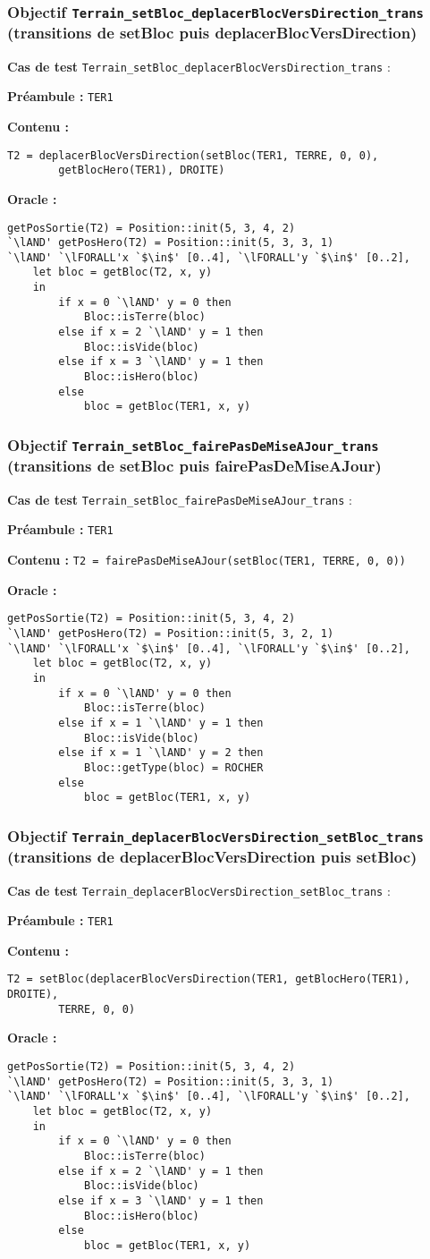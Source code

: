 \documentclass{article}
\newcommand{\cmd}[1]{\texttt{#1}}
\newcommand{\lAND}{$\land$}
\newcommand{\lFORALL}{$\forall$}
\newcommand{\obj}[2]{\subsubsection*{\large{\textbf{Objectif {\cmd{#1} (#2)}}}}}
\newenvironment{cas}[1]
{
	\hspace{1em}\textbf{Cas de test} \cmd{#1} :
	\begin{list}{}{}
}{
	\end{list}\vspace{1em}
}
\newcommand{\pre}[1]{\item \textbf{Préambule :} \cmd{#1}}
\newcommand{\ope}[1]{\item \textbf{Contenu :} \cmd{#1}}
\newcommand{\oram}{\item \textbf{Oracle :}}
\newcommand{\opem}{\item \textbf{Contenu :}}
\begin{document}
\obj{Terrain\_setBloc\_deplacerBlocVersDirection\_trans} {transitions de setBloc puis deplacerBlocVersDirection}
	\begin{cas} {Terrain\_setBloc\_deplacerBlocVersDirection\_trans}
		\pre{TER1}
		\opem{}
		\begin{lstlisting}
T2 = deplacerBlocVersDirection(setBloc(TER1, TERRE, 0, 0),
		getBlocHero(TER1), DROITE)
		\end{lstlisting}
		\oram{}
		\begin{lstlisting}
getPosSortie(T2) = Position::init(5, 3, 4, 2)
`\lAND' getPosHero(T2) = Position::init(5, 3, 3, 1)
`\lAND' `\lFORALL'x `$\in$' [0..4], `\lFORALL'y `$\in$' [0..2],
	let bloc = getBloc(T2, x, y)
	in
		if x = 0 `\lAND' y = 0 then
			Bloc::isTerre(bloc)
		else if x = 2 `\lAND' y = 1 then
			Bloc::isVide(bloc)
		else if x = 3 `\lAND' y = 1 then
			Bloc::isHero(bloc)
		else
			bloc = getBloc(TER1, x, y)
		\end{lstlisting}
	\end{cas}

\obj{Terrain\_setBloc\_fairePasDeMiseAJour\_trans} {transitions de setBloc puis fairePasDeMiseAJour}
	\begin{cas} {Terrain\_setBloc\_fairePasDeMiseAJour\_trans}
		\pre{TER1}
		\ope{T2 = fairePasDeMiseAJour(setBloc(TER1, TERRE, 0, 0))}
		\oram{}
		\begin{lstlisting}
getPosSortie(T2) = Position::init(5, 3, 4, 2)
`\lAND' getPosHero(T2) = Position::init(5, 3, 2, 1)
`\lAND' `\lFORALL'x `$\in$' [0..4], `\lFORALL'y `$\in$' [0..2],
	let bloc = getBloc(T2, x, y)
	in
		if x = 0 `\lAND' y = 0 then
			Bloc::isTerre(bloc)
		else if x = 1 `\lAND' y = 1 then
			Bloc::isVide(bloc)
		else if x = 1 `\lAND' y = 2 then
			Bloc::getType(bloc) = ROCHER
		else
			bloc = getBloc(TER1, x, y)
		\end{lstlisting}
	\end{cas}

\obj{Terrain\_deplacerBlocVersDirection\_setBloc\_trans} {transitions de deplacerBlocVersDirection puis setBloc}
	\begin{cas} {Terrain\_deplacerBlocVersDirection\_setBloc\_trans}
		\pre{TER1}
		\opem{}
		\begin{lstlisting}
T2 = setBloc(deplacerBlocVersDirection(TER1, getBlocHero(TER1), DROITE),
		TERRE, 0, 0)
		\end{lstlisting}
		\oram{}
		\begin{lstlisting}
getPosSortie(T2) = Position::init(5, 3, 4, 2)
`\lAND' getPosHero(T2) = Position::init(5, 3, 3, 1)
`\lAND' `\lFORALL'x `$\in$' [0..4], `\lFORALL'y `$\in$' [0..2],
	let bloc = getBloc(T2, x, y)
	in
		if x = 0 `\lAND' y = 0 then
			Bloc::isTerre(bloc)
		else if x = 2 `\lAND' y = 1 then
			Bloc::isVide(bloc)
		else if x = 3 `\lAND' y = 1 then
			Bloc::isHero(bloc)
		else
			bloc = getBloc(TER1, x, y)
		\end{lstlisting}
	\end{cas}
\end{document}
